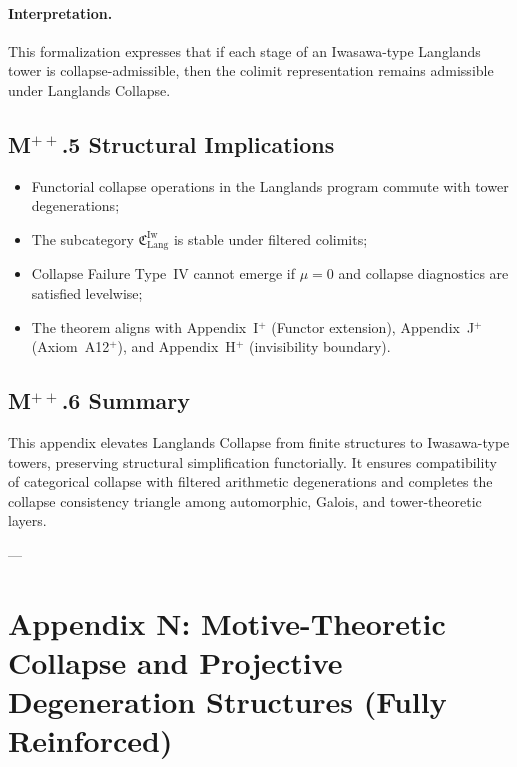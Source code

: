\documentclass[11pt]{article}
\begin{document}
\paragraph{Interpretation.} This formalization expresses that if each stage of an Iwasawa-type Langlands tower is collapse-admissible, then the colimit representation remains admissible under Langlands Collapse.

\subsection*{M$^{++}$.5 Structural Implications}

\begin{itemize}
    \item Functorial collapse operations in the Langlands program commute with tower degenerations;
    \item The subcategory \( \mathfrak{C}^{\mathrm{Iw}}_{\mathrm{Lang}} \) is stable under filtered colimits;
    \item Collapse Failure Type~IV cannot emerge if \( \mu = 0 \) and collapse diagnostics are satisfied levelwise;
    \item The theorem aligns with Appendix~I$^+$ (Functor extension), Appendix~J$^+$ (Axiom~A12$^+$), and Appendix~H$^+$ (invisibility boundary).
\end{itemize}

\subsection*{M$^{++}$.6 Summary}

This appendix elevates Langlands Collapse from finite structures to Iwasawa-type towers, preserving structural simplification functorially. It ensures compatibility of categorical collapse with filtered arithmetic degenerations and completes the collapse consistency triangle among automorphic, Galois, and tower-theoretic layers.

---



\section*{Appendix N: Motive-Theoretic Collapse and Projective Degeneration Structures (Fully Reinforced)}
\end{document}
